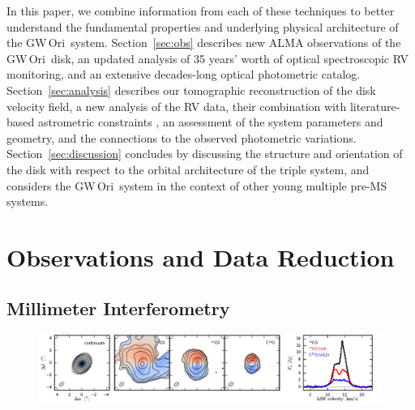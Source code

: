 \documentclass[twocolumn]{aastex61}
\newcommand{\obj}{GW\,Ori}
\begin{document}
In this paper, we combine information from each of these techniques to better understand the fundamental properties and underlying physical architecture of the \obj\ system.  Section~\ref{sec:obs} describes new ALMA observations of the \obj\ disk, an updated analysis of 35 years' worth of optical spectroscopic RV monitoring, and an extensive decades-long optical photometric catalog.  Section~\ref{sec:analysis} describes our tomographic reconstruction of the disk velocity field, a new analysis of the RV data, their combination with literature-based astrometric constraints \citep{berger11}, an assessment of the system parameters and geometry, and the connections to the observed photometric variations. Section~\ref{sec:discussion} concludes by discussing the structure and orientation of the disk with respect to the orbital architecture of the triple system, and considers the \obj\ system in the context of other young multiple pre-MS systems.  




\section{Observations and Data Reduction \label{sec:obs}}


\subsection{Millimeter Interferometry}

\begin{figure}[ht!]
\begin{center}
  \includegraphics[width=\linewidth]{moments.pdf}
  \end{center}
\end{figure}
\end{document}
